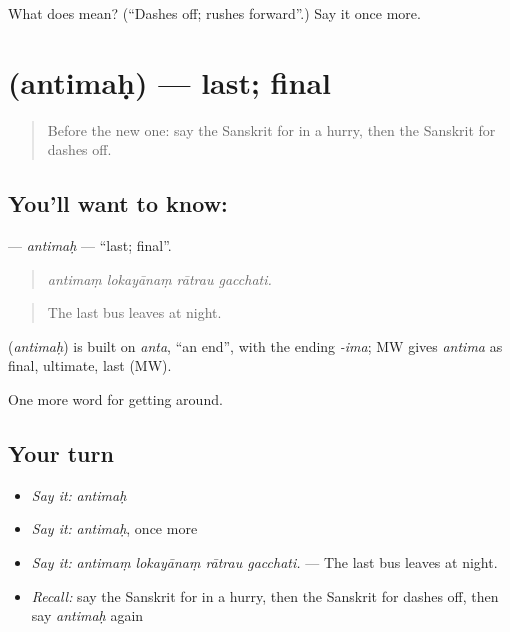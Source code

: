 \begin{tcolorbox}[breakable,colback=teal!4,colframe=teal!35!black,title={Before you move on}]
What does  mean? (\textquotedblleft{}Dashes off; rushes forward\textquotedblright{}.) Say it once more.
\end{tcolorbox}
\section[\texorpdfstring{\sk{अन्तिमः} (antimaḥ)}{अन्तिमः (antimaḥ)}]{ (antimaḥ) — last; final}

\label{lesson:SA-C405-antimah}



\begin{quote}
Before the new one: say the Sanskrit for in a hurry, then the Sanskrit for dashes off.
\end{quote}

\subsection*{You'll want to know: }
\textbf{} — \emph{antimaḥ} — \textquotedblleft{}last; final\textquotedblright{}.

\begin{quote}
   
\end{quote}

\begin{quote}
\emph{antimaṃ lokayānaṃ rātrau gacchati.}
\end{quote}

\begin{quote}
The last bus leaves at night.
\end{quote}

\begin{cousinweb}
\textbf{} (\emph{antimaḥ}) is built on \emph{anta}, \textquotedblleft{}an end\textquotedblright{}, with the ending \emph{-ima}; MW gives \emph{antima} as final, ultimate, last (MW).
\end{cousinweb}

\begin{grammarlens}[title={What you've built}]
One more word for getting around.
\end{grammarlens}

\subsection*{Your turn}
\begin{itemize}
\raggedright
  \item \emph{Say it:} \emph{antimaḥ}
  \item \emph{Say it:} \emph{antimaḥ}, once more
  \item \emph{Say it:} \emph{antimaṃ lokayānaṃ rātrau gacchati.} — The last bus leaves at night.
  \item \emph{Recall:} say the Sanskrit for in a hurry, then the Sanskrit for dashes off, then say \emph{antimaḥ} again
\end{itemize}

